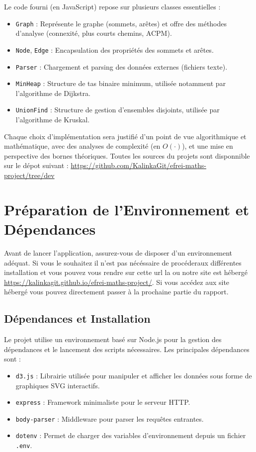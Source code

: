 \documentclass[a4paper,12pt]{article}
\begin{document}
Le code fourni (en JavaScript) repose sur plusieurs classes essentielles :
\begin{itemize}
    \item \texttt{Graph} : Représente le graphe (sommets, arêtes) et offre des méthodes d’analyse (connexité, plus courts chemins, ACPM).
    \item \texttt{Node}, \texttt{Edge} : Encapsulation des propriétés des sommets et arêtes.
    \item \texttt{Parser} : Chargement et parsing des données externes (fichiers texte).
    \item \texttt{MinHeap} : Structure de tas binaire minimum, utilisée notamment par l’algorithme de Dijkstra.
    \item \texttt{UnionFind} : Structure de gestion d'ensembles disjoints, utilisée par l’algorithme de Kruskal.
\end{itemize}

Chaque choix d’implémentation sera justifié d’un point de vue algorithmique et mathématique, avec des analyses de complexité (en $O(\cdot)$), et une mise en perspective des bornes théoriques. Toutes les sources du projets sont disponnible sur le dépot suivant : \url{https://github.com/KalinkaGit/efrei-maths-project/tree/dev}


\section{Préparation de l'Environnement et Dépendances}

Avant de lancer l’application, assurez-vous de disposer d’un environnement adéquat. Si vous le souhaitez il n'est pas nécéssaire de procéderaux différentes installation et vous pouvez vous rendre sur cette url la ou notre site est hébergé \url{https://kalinkagit.github.io/efrei-maths-project/}. Si vous accédez aux site hébergé vous pouvez directement passer à la prochaine partie du rapport.

\subsection{Dépendances et Installation}

Le projet utilise un environnement basé sur Node.js pour la gestion des dépendances et le lancement des scripts nécessaires. Les principales dépendances sont :

\begin{itemize}
    \item \texttt{d3.js} : Librairie utilisée pour manipuler et afficher les données sous forme de graphiques SVG interactifs.
    \item \texttt{express} : Framework minimaliste pour le serveur HTTP.
    \item \texttt{body-parser} : Middleware pour parser les requêtes entrantes.
    \item \texttt{dotenv} : Permet de charger des variables d’environnement depuis un fichier \texttt{.env}.
\end{itemize}
\end{document}
